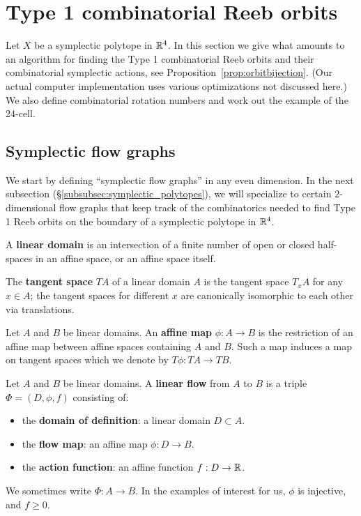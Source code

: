 
\section{Type 1 combinatorial Reeb orbits}
\label{sec:type1}

Let $X$ be a symplectic polytope in ${\mathbb R}^4$. In this section we give what amounts to an algorithm for finding the Type 1 combinatorial Reeb orbits and their combinatorial symplectic actions, see Proposition~\ref{prop:orbitbijection}. (Our actual computer implementation uses various optimizations not discussed here.) We also define combinatorial rotation numbers and work out the example of the 24-cell.

\subsection{Symplectic flow graphs}
\label{subsec:symplectic_flow_graphs}

We start by defining ``symplectic flow graphs'' in any even dimension. In the next subsection (\S \ref{subsubsec:symplectic_polytopes}), we will specialize to certain $2$-dimensional flow graphs that keep track of the combinatorics needed to find Type 1 Reeb orbits on the boundary of a symplectic polytope in ${\mathbb R}^4$. 

\begin{definition}
\label{def:linear_domain}
A {\bf linear domain\/} is an intersection of a finite number of open or closed half-spaces in an affine space, or an affine space itself.
\end{definition}

\begin{definition}
\label{def:tangent_space} The {\bf tangent space} $TA$ of a linear domain $A$ is the tangent space $T_xA$ for any $x\in A$; the tangent spaces for different $x$ are canonically isomorphic to each other via translations.
\end{definition}

\begin{definition}
\label{def:affine_map_of_linear_domains}
Let $A$ and $B$ be linear domains. An {\bf affine map} $\phi:A \to B$ is the restriction of an affine map between affine spaces containing $A$ and $B$. Such a map induces a map on tangent spaces which we denote by $T\phi: TA\to TB$.
\end{definition}

\begin{definition}
\label{def:linear_flow}
Let $A$ and $B$ be linear domains. A {\bf linear flow} from $A$ to $B$ is a triple $\Phi = (D,\phi,f)$ consisting of:
\begin{itemize}
	\item the {\bf domain of definition}: a linear domain $D \subset A$.
	\item the {\bf flow map}: an affine map $\phi:D \to B$.
	\item the {\bf action function}: an affine function $f:D \to {\mathbb R}$.
\end{itemize}
We sometimes write $\Phi:A\to B$. In the examples of interest for us, $\phi$ is injective, and $f\ge 0$.
\end{definition}

